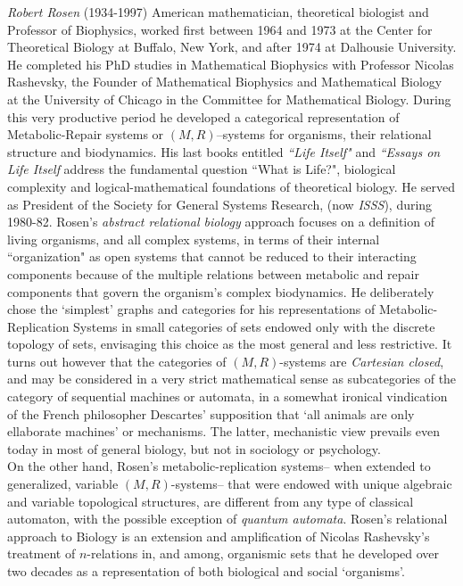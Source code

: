 \documentclass[12pt]{article}
\theoremstyle{plain}
\theoremstyle{definition}
\numberwithin{equation}{section}
\begin{document}
\emph{Robert Rosen} (1934-1997) American mathematician, theoretical biologist and Professor of Biophysics, worked first between 1964 and 1973 at the Center for Theoretical Biology at Buffalo, New York, and after 1974 at Dalhousie University. He completed his PhD studies in Mathematical Biophysics with Professor Nicolas Rashevsky, the Founder of Mathematical Biophysics and Mathematical Biology at the University of Chicago in the Committee for Mathematical Biology. During this very productive period he developed a categorical representation of Metabolic-Repair systems or $(M,R)$--systems for organisms, their relational structure and biodynamics. His last books entitled \emph{``Life Itself"} and \emph{``Essays on Life Itself} address the fundamental question ``What is Life?", biological complexity and logical-mathematical foundations of theoretical biology. He served as President of the Society for General Systems Research, (now \emph{ISSS}), during 1980-82.  Rosen's \emph{abstract relational biology} approach focuses on a definition of living organisms, and all complex systems, in terms of their internal ``organization" as open systems that cannot be reduced to their interacting components because of the multiple relations between metabolic and repair components that govern the organism's complex biodynamics. He deliberately chose the `simplest' graphs and categories for his representations of Metabolic-Replication Systems in small categories of sets endowed only with the discrete topology of sets, envisaging this choice as the most general and less restrictive. It turns out however that the categories of $(M,R)$-systems are \emph{Cartesian closed}, and may be considered in a very strict mathematical sense as subcategories of the category of sequential machines or automata, in a somewhat ironical vindication of the French philosopher Descartes' supposition that `all animals are only ellaborate machines' or mechanisms. The latter, mechanistic view prevails even today in most of general biology, but not in sociology or psychology.\\

 On the other hand, Rosen's metabolic-replication systems-- when extended to generalized, variable $(M,R)$-systems-- that were endowed with unique algebraic and variable topological structures, are different from any type of classical automaton, with the possible exception of \emph{quantum automata}. Rosen's relational approach to Biology is an extension and amplification of Nicolas Rashevsky's treatment of $n$-relations in, and among, organismic sets that he developed over two decades as a representation of both biological and social `organisms'.  
\end{document}
